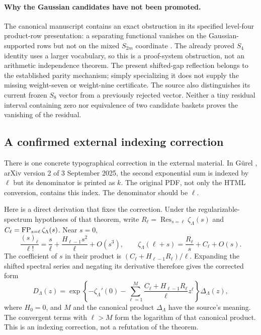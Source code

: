 \paragraph{Why the Gaussian candidates have not been promoted.}
The canonical manuscript contains an exact obstruction in its specified
level-four product-row presentation: a separating functional vanishes on
the Gaussian-supported rows but not on the mixed $S_{2m}$ coordinate
\cite[]{repo}.
The already proved $S_4$ identity uses a larger vocabulary, so this is
a proof-system obstruction, not an arithmetic independence theorem.
The present shifted-gap reflection belongs to the established parity
mechanism; simply specializing it does not supply the missing
weight-seven or weight-nine certificate. The source also distinguishes
its current frozen $S_8$ vector from a previously rejected vector.
Neither a tiny residual interval containing zero nor equivalence of two
candidate baskets proves the vanishing of the residual.

\subsection{A confirmed external indexing correction}

There is one concrete typographical correction in the external material.
In G\"urel \cite[Theorem 1.1, printed p.~2]{gurel}, arXiv version 2 of
3 September 2025, the second exponential sum is indexed by $\ell$ but
its denominator is printed as $k$. The original PDF, not only the HTML
conversion, contains this index. The denominator should be $\ell$.

Here is a direct derivation that fixes the correction. Under the
regularizable-spectrum hypotheses of that theorem, write
$R_\ell=\operatorname{Res}_{s=\ell}\zeta_\Lambda(s)$ and
$C_\ell=\operatorname{FP}_{s=\ell}\zeta_\Lambda(s)$. Near $s=0$,
\[
 \frac{(s)_\ell}{\ell!}
       =\frac{s}{\ell}+\frac{H_{\ell-1}s^2}{\ell}+O(s^3),
 \qquad
 \zeta_\Lambda(\ell+s)=\frac{R_\ell}{s}+C_\ell+O(s).
\]
The coefficient of $s$ in their product is
$(C_\ell+H_{\ell-1}R_\ell)/\ell$. Expanding the shifted spectral
series and negating its derivative therefore gives the corrected form
\begin{equation}\label{eq:Gurel-correction}
 D_\Lambda(z)=\exp\left\{-\zeta_\Lambda'(0)
  -\sum_{\ell=1}^{M}
     \frac{C_\ell+H_{\ell-1}R_\ell}{\ell}z^\ell\right\}
                                                    \Delta_\Lambda(z),
\end{equation}
where $H_0=0$, and $M$ and the canonical product $\Delta_\Lambda$
have the source's meaning. The convergent terms with $\ell>M$ form
the logarithm of that canonical product. This is an indexing correction,
not a refutation of the theorem.

